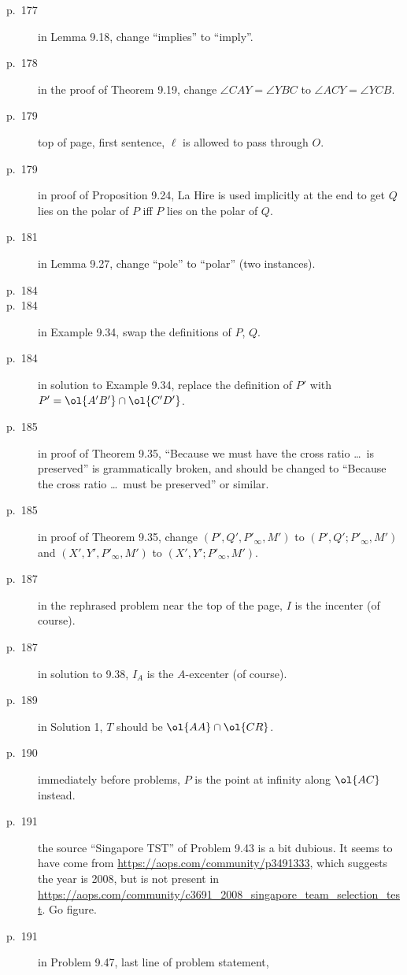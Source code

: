 \documentclass[11pt]{scrartcl}
\begin{document}
\begin{description}
\item[p.\  177] in Lemma 9.18, change ``implies'' to ``imply''.
\item[p.\  178] in the proof of Theorem 9.19, change $\angle CAY = \angle YBC$ to $\angle ACY = \angle YCB$.
\item[p.\  179] top of page, first sentence, $\ell$ is allowed to pass through $O$.
\item[p.\  179] in proof of Proposition 9.24, La Hire is used implicitly at the end
  to get $Q$ lies on the polar of $P$ iff $P$ lies on the polar of $Q$.
\item[p.\  181] in Lemma 9.27, change ``pole'' to ``polar'' (two instances).
\item[p.\  184] 
\item[p.\  184] in Example 9.34, swap the definitions of $P$, $Q$.
\item[p.\  184] in solution to Example 9.34,
  replace the definition of $P'$ with $P' = \ol{A'B'} \cap \ol{C'D'}$.
\item[p.\  185] in proof of Theorem 9.35,
  ``Because we must have the cross ratio \dots\ is preserved''
  is grammatically broken, and should be changed to
  ``Because the cross ratio \dots\ must be preserved'' or similar.
\item[p.\  185] in proof of Theorem 9.35, change
  $(P', Q', P'_\infty, M')$ to $(P', Q'; P'_\infty, M')$
  and $(X', Y', P'_\infty, M')$ to $(X', Y'; P'_\infty, M')$.
\item[p.\  187] in the rephrased problem near the top of the page, $I$ is the incenter (of course).
\item[p.\  187] in solution to 9.38, $I_A$ is the $A$-excenter (of course).
\item[p.\  189] in Solution 1, $T$ should be $\ol{AA} \cap \ol{CR}$.
\item[p.\  190] immediately before problems, $P$ is the point at infinity along $\ol{AC}$ instead.
\item[p.\  191] the source ``Singapore TST'' of Problem 9.43 is a bit dubious.
  It seems to have come from \url{https://aops.com/community/p3491333},
  which suggests the year is 2008,
  but is not present in \url{https://aops.com/community/c3691_2008_singapore_team_selection_test}.
  Go figure.
\item[p.\  191] in Problem 9.47, last line of problem statement,

\end{description}
\end{document}
